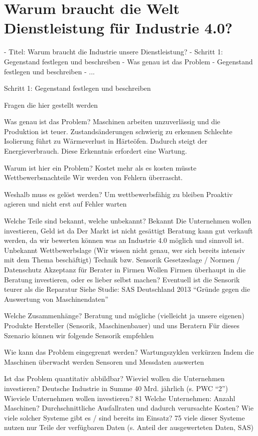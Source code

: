 \section{Warum braucht die Welt Dienstleistung für Industrie 4.0?}

- Titel: Warum braucht die Industrie unsere Dienstleistung?
- Schritt 1: Gegenstand festlegen und beschreiben
- Was genau ist das Problem
- Gegenstand festlegen und beschreiben
- ...

Schritt 1: Gegenstand festlegen und beschreiben

Fragen die hier gestellt werden

Was genau ist das Problem?
Maschinen arbeiten unzuverlässig und die Produktion ist teuer.
Zustandsänderungen schwierig zu erkennen
Schlechte Isolierung führt zu Wärmeverlust in Härteöfen. Dadurch steigt der Energieverbrauch. Diese Erkenntnis erfordert eine Wartung.

Warum ist hier ein Problem?
Kostet mehr als es kosten müsste
Wettbewerbsnachteile
Wir werden von Fehlern überrascht.

Weshalb muss es gelöst werden?
Um wettbewerbsfähig zu bleiben
Proaktiv agieren und nicht erst auf Fehler warten

Welche Teile sind bekannt, welche unbekannt?
Bekannt
Die Unternehmen wollen investieren, Geld ist da
Der Markt ist nicht gesättigt
Beratung kann gut verkauft werden, da wir bewerten können was an Industrie 4.0 möglich und sinnvoll ist.
Unbekannt
Wettbewerbslage (Wir wissen nicht genau, wer sich bereits intensiv mit dem Thema beschäftigt)
Technik bzw. Sensorik
Gesetzeslage / Normen / Datenschutz
Akzeptanz für Berater in Firmen
Wollen Firmen überhaupt in die Beratung investieren, oder es lieber selbst machen?
Eventuell ist die Sensorik teurer als die Reparatur
Siehe Studie: SAS Deutschland 2013 “Gründe gegen die Auswertung von Maschinendaten”

Welche Zusammenhänge?
Beratung und mögliche (vielleicht ja unsere eigenen) Produkte
Hersteller (Sensorik, Maschinenbauer) und uns Beratern
Für dieses Szenario können wir folgende Sensorik empfehlen

Wie kann das Problem eingegrenzt werden?
Wartungszyklen verkürzen
Indem die Maschinen überwacht werden
Sensoren und Messdaten auswerten

Ist das Problem quantitativ abbildbar?
Wieviel wollen die Unternehmen investieren?
Deutsche Industrie in Summe 40 Mrd. jährlich (s. PWC “2”)
Wieviele Unternehmen wollen investieren?
81%
Welche Unternehmen: Anzahl Maschinen?
Durchschnittliche Ausfallraten und dadurch verursachte Kosten?
Wie viele solcher Systeme gibt es / sind bereits im Einsatz?
75%
viele dieser Systeme nutzen nur Teile der verfügbaren Daten (s. Anteil der ausgewerteten Daten, SAS) 

